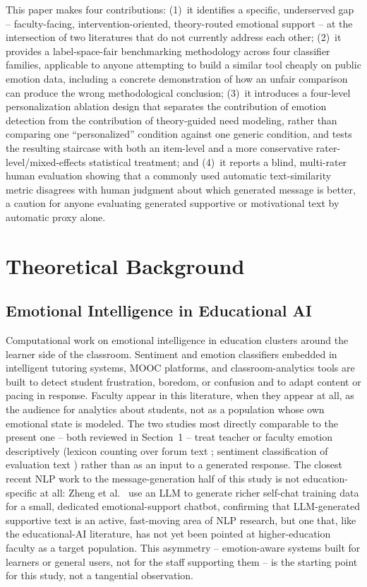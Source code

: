 \documentclass[higheredu,article,submit,pdftex,moreauthors]{Definitions/mdpi}
\begin{document}
This paper makes four contributions: (1)~it identifies a specific, underserved gap -- faculty-facing, intervention-oriented, theory-routed emotional support -- at the intersection of two literatures that do not currently address each other; (2)~it provides a label-space-fair benchmarking methodology across four classifier families, applicable to anyone attempting to build a similar tool cheaply on public emotion data, including a concrete demonstration of how an unfair comparison can produce the wrong methodological conclusion; (3)~it introduces a four-level personalization ablation design that separates the contribution of emotion detection from the contribution of theory-guided need modeling, rather than comparing one ``personalized'' condition against one generic condition, and tests the resulting staircase with both an item-level and a more conservative rater-level/mixed-effects statistical treatment; and (4)~it reports a blind, multi-rater human evaluation showing that a commonly used automatic text-similarity metric disagrees with human judgment about which generated message is better, a caution for anyone evaluating generated supportive or motivational text by automatic proxy alone.

\section{Theoretical Background}

\subsection{Emotional Intelligence in Educational AI}

Computational work on emotional intelligence in education clusters around the learner side of the classroom. Sentiment and emotion classifiers embedded in intelligent tutoring systems, MOOC platforms, and classroom-analytics tools are built to detect student frustration, boredom, or confusion and to adapt content or pacing in response. Faculty appear in this literature, when they appear at all, as the audience for analytics about students, not as a population whose own emotional state is modeled. The two studies most directly comparable to the present one -- both reviewed in Section~1 -- treat teacher or faculty emotion descriptively (lexicon counting over forum text \cite{chen2020}; sentiment classification of evaluation text \cite{li2022}) rather than as an input to a generated response. The closest recent NLP work to the message-generation half of this study is not education-specific at all: Zheng et al.\ \cite{zheng2024} use an LLM to generate richer self-chat training data for a small, dedicated emotional-support chatbot, confirming that LLM-generated supportive text is an active, fast-moving area of NLP research, but one that, like the educational-AI literature, has not yet been pointed at higher-education faculty as a target population. This asymmetry -- emotion-aware systems built for learners or general users, not for the staff supporting them -- is the starting point for this study, not a tangential observation.
\end{document}
